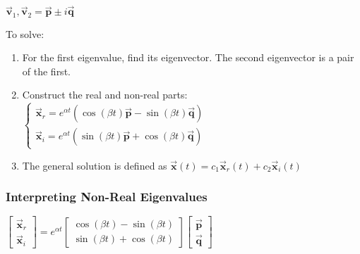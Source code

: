 \documentclass[12pt,landscape,twocolumn]{article}
\let\oldvec\vec
\renewcommand{\vec}[1]{\oldvec{\mathbf{ #1 } } }                    %
\begin{document}
        $
            \vec{v}_1, \vec{v}_2 = \vec{p} \pm i \vec{q}
        $

    To solve:

        \begin{enumerate}
            \item For the first eigenvalue, find its eigenvector. The second eigenvector is a pair of the first.
            \item Construct the real and non-real parts:
                $
                    \begin{cases}
                        \vec{x}_r = e^{\alpha t} ( \cos(\beta t) \vec{p} - \sin(\beta t)\vec{q})\\
                        \vec{x}_i = e^{\alpha t} ( \sin(\beta t) \vec{p} + \cos(\beta t)\vec{q})
                    \end{cases}
                $
            \item The general solution is defined as
                $
                    \vec{x}(t) = c_1 \vec{x}_r(t) + c_2 \vec{x}_i(t)
                $
        \end{enumerate}

        \subsubsection{Interpreting Non-Real Eigenvalues}
        $
            \left[ \begin{array}{c}
                \vec{x}_r\\
                \vec{x}_i
            \end{array} \right] = e^{\alpha t}
            \left[ \begin{array}{c}
                \cos(\beta t) - \sin(\beta t)\\
                \sin(\beta t) + \cos(\beta t)
            \end{array} \right]
            \left[ \begin{array}{c}
                \vec{p}\\
                \vec{q}
            \end{array} \right]
        $
\end{document}
